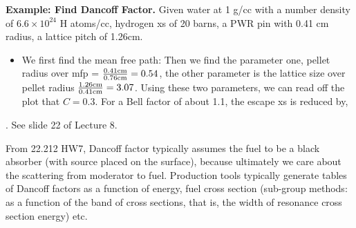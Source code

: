 \documentclass{school-22.211-notes}
\begin{document}
\textbf{Example: Find Dancoff Factor.} Given water at 1 g/cc with a number density of $6.6 \times 10^{24}$ H atoms/cc, hydrogen xs of 20 barns, a PWR pin with 0.41 cm radius, a lattice pitch of 1.26cm. 
\begin{itemize}
\item We first find the mean free path: 
Then we find the parameter one, pellet radius over mfp = $\frac{0.41 \mathrm{cm}}{0.76 \mathrm{cm}}  = 0.54$, the other parameter is the lattice size over pellet radius $\frac{1.26 \mathrm{cm}}{0.41 \mathrm{cm}} = 3.07$. Using these two parameters, we can read off the plot that $C = 0.3$. For a Bell factor of about 1.1, the escape xs is reduced by,
\end{itemize}
. See slide 22 of Lecture 8. 

From 22.212 HW7, Dancoff factor typically assumes the fuel to be a black absorber (with source placed on the surface), because ultimately we care about the scattering from moderator to fuel. Production tools typically generate tables of Dancoff factors as a function of energy, fuel cross section (sub-group methods: as a function of the band of cross sections, that is, the width of resonance cross section energy) etc.
\end{document}
